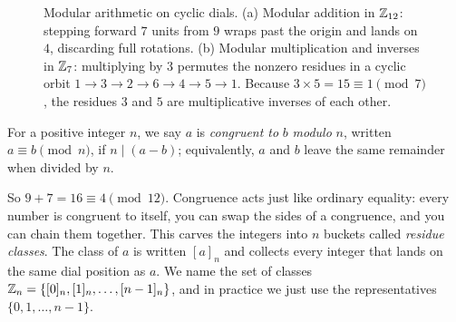 \begin{figure}[H]
\caption{Modular arithmetic on cyclic dials. (a) Modular addition in $\mathbb{Z}_{12}$:
stepping forward $7$ units from $9$ wraps past the origin and lands on $4$,
discarding full rotations. (b) Modular multiplication and inverses in $\mathbb{Z}_7$:
multiplying by $3$ permutes the nonzero residues in a cyclic orbit
$1 \to 3 \to 2 \to 6 \to 4 \to 5 \to 1$. Because $3 \times 5 = 15 \equiv 1 \pmod 7$,
the residues $3$ and $5$ are multiplicative inverses of each other.}
\label{ch30:fig-clock}
\end{figure}

\begin{definition}
\label{ch30:def-congruence}
For a positive integer $n$, we say $a$ is \emph{congruent to} $b$ \emph{modulo}
$n$, written $a \equiv b \pmod{n}$, if $n \mid (a - b)$; equivalently, $a$ and
$b$ leave the same remainder when divided by $n$.
\end{definition}

So $9 + 7 = 16 \equiv 4 \pmod{12}$. Congruence acts just like ordinary equality: every number is congruent to itself, you can swap the sides of a congruence, and you can chain them together. This carves the integers into $n$
buckets called \emph{residue classes}. The class of $a$ is written $[a]_n$ and
collects every integer that lands on the same dial position as $a$. We name the
set of classes $\mathbb{Z}_n = \{[0]_n, [1]_n, \dots, [n-1]_n\}$, and in practice we just
use the representatives $\{0,1,\dots,n-1\}$.

